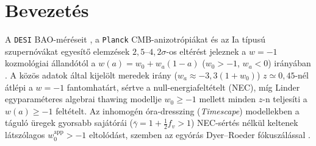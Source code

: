 \documentclass[11pt,a4paper]{article}
\begin{document}
\section{Bevezet\'es}
A \texttt{DESI} BAO-m\'er\'eseit \cite{DESI2024VI,DESIDR2_2025}, a \texttt{Planck} CMB-anizotr\'opi\'akat \cite{Planck2018VI} \'es az Ia t\'ipus\'u szupern\'ov\'akat egyes\'it\H{o} elemz\'esek $2{,}5\text{--}4{,}2\sigma$-os elt\'er\'est jeleznek a $w = -1$ kozmol\'ogiai \'alland\'ot\'ol a $w(a) = w_0 + w_a(1 - a)$ ($w_0 > -1$, $w_a < 0$) ir\'any\'aban \cite{DES2026DynDE,Efstathiou2025SN,DESSN5YR2024,Brout2022,PopovicDovekie2025,RubinUnion3_2025}. A k\"oz\"os adatok \'altal kijel\"olt meredek ir\'any ($w_a \approx -3{,}3(1+w_0)$) $z \simeq 0{,}45$-n\'el \'atl\'epi a $w = -1$ fantomhat\'art, s\'ertve a null-energiafelt\'etelt (NEC), m\'ig Linder \cite{Linder2015Thawing} egyparam\'eteres algebrai thawing modellje $w_0 \ge -1$ mellett minden $z$-n teljes\'iti a $w(a) \ge -1$ felt\'etelt. Az inhomog\'en \'ora-dresszing (\textit{Timescape}) modellekben \cite{Wiltshire2009PRD,LaneWiltshire2025MNRAS,SeifertWiltshire2025MNRAS} a t\'agul\'o \"uregek gyorsabb saj\'at\'or\'ai ($\bar{\gamma} = 1 + \frac{1}{2}f_v > 1$) NEC-s\'ert\'es n\'elk\"ul keltenek l\'atsz\'olagos $w_0^{\mathrm{app}} > -1$ eltol\'od\'ast, szemben az egy\'or\'as Dyer--Roeder f\'okusz\'al\'assal \cite{Kantowski1969,DyerRoeder1973,Weinberg1976}.
\end{document}
